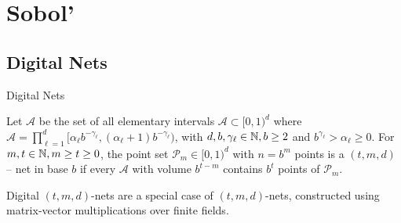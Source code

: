 \documentclass[handout, 10pt,compress,xcolor={usenames,dvipsnames}]{beamer} %
\begin{document}
\section{Sobol'}

\subsection{Digital Nets}






\begin{frame}{Digital Nets}
	\vspace{-1ex}
\begin{Definition}[$(t, m, d)$ -- net]
	\label{defn:tmd_net}
	Let $\mathcal{A}$ be the set of all elementary intervals $\mathcal{A} \subset [0, 1)^d$ where
	$\mathcal{A} = \prod_{\ell=1}^d [\alpha_\ell b^{-\gamma_\ell} , (\alpha_\ell + 1) b^{-\gamma_\ell})$, 
	with $d,b,\gamma_\ell \in \mathbb{N}, b \ge 2$ 
	and $b^{\gamma_\ell}
	> \alpha_\ell \ge 0$. For $m,t \in \mathbb{N}, m \ge t \ge 0$, the point set $\mathcal{P}_m \in [0, 1)^d$ with $n = b^m$ points is a $(t, m, d)$ -- net in base $b$ if every $\mathcal{A}$ with volume $b^{t-m}$ contains $b^t$ points of $\mathcal{P}_m$.
\end{Definition}	

Digital $(t,m, d)$-nets are a special case of $(t,m, d)$-nets, constructed using matrix-vector multiplications over finite fields. 

\end{frame}
\end{document}
